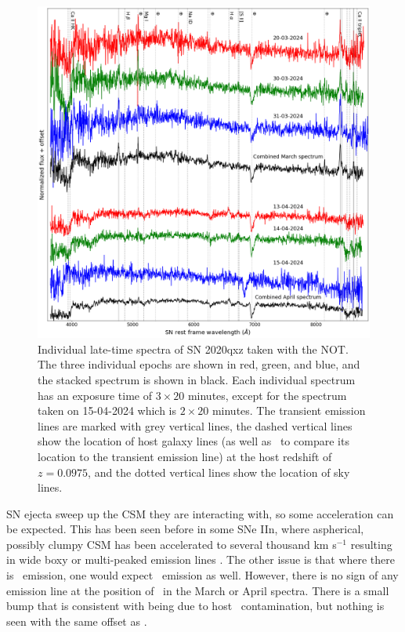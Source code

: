 \documentclass[a4paper,oneside,12pt, class=Latex/Classes/PhDthesisPSnPDF, crop=false]{standalone}
\begin{document}
\begin{figure}[h!]
    \centering
    \includegraphics[width=\textwidth]{../Images/chapter_5/2020qxz_all_spec.png}
    \caption[Individual spectra of SN 2020qxz.]{Individual late-time spectra of SN 2020qxz taken with the NOT. The three individual epochs are shown in red, green, and blue, and the stacked spectrum is shown in black. Each individual spectrum has an exposure time of $3\times20$ minutes, except for the spectrum taken on 15-04-2024 which is $2\times20$ minutes. The transient emission lines are marked with grey vertical lines, the dashed vertical lines show the location of host galaxy lines (as well as \Hbeta\ to compare its location to the transient emission line) at the host redshift of $z=0.0975$, and the dotted vertical lines show the location of sky lines.}
    \label{fig:2020qxz_all_spec}
\end{figure}

SN ejecta sweep up the CSM they are interacting with, so some acceleration can be expected. This has been seen before in some SNe IIn, where aspherical, possibly clumpy CSM has been accelerated to several thousand km s$^{-1}$ resulting in wide boxy or multi-peaked emission lines \citep{1998S_aspherical_CSM, 1998S_late-time, PTF11iqb}. The other issue is that where there is \Hbeta\ emission, one would expect \Halpha\ emission as well. However, there is no sign of any emission line at the position of \Halpha\ in the March or April spectra. There is a small bump that is consistent with being due to host \Halpha\ contamination, but nothing is seen with the same offset as \Hbeta.
\end{document}
